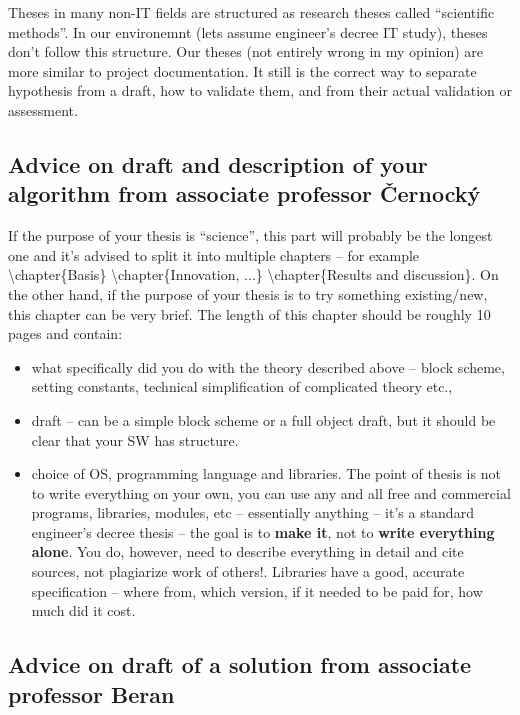 Theses in many non-IT fields are structured as research theses called ``scientific methods''. In our environemnt (lets assume engineer's decree IT study), theses don't follow this structure. Our theses (not entirely wrong in my opinion) are more similar to project documentation. It still is the correct way to separate hypothesis from a draft, how to validate them, and from their actual validation or assessment.


\subsection{Advice on draft and description of your algorithm from associate professor Černocký}

If the purpose of your thesis is ``science'', this part will probably be the longest one and it's advised to split it into multiple chapters -- for example \textbackslash chapter\{Basis\} \textbackslash chapter\{Innovation, ...\} \textbackslash chapter\{Results and discussion\}. On the other hand, if the purpose of your thesis is to try something existing/new, this chapter can be very brief. The length of this chapter should be roughly 10 pages and contain:
\begin{itemize}
  \item{what specifically did you do with the theory described above -- block scheme, setting constants, technical simplification of complicated theory etc.,}
  \item{draft -- can be a simple block scheme or a full object draft, but it should be clear that your SW has structure.}
  \item{choice of OS, programming language and libraries. The point of thesis is not to write everything on your own, you can use any and all free and commercial programs, libraries, modules, etc -- essentially anything -- it's a standard engineer's decree thesis -- the goal is to \textbf{make it}, not to \textbf{write everything alone}. You do, however, need to describe everything in detail and cite sources, not plagiarize work of others!. Libraries have a good, accurate specification -- where from, which version, if it needed to be paid for, how much did it cost.}
\end{itemize}

\subsection{Advice on draft of a solution from associate professor Beran}

